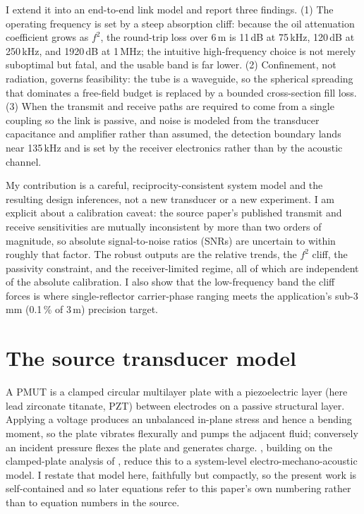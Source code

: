\documentclass{article}
\newcommand{\oilA}{11}      %
\newcommand{\oilB}{120}     %
\newcommand{\oilC}{1920}    %
\newcommand{\fbound}{135}   %
\begin{document}
I extend it into an end-to-end link model and report three findings. (1) The operating
frequency is set by a steep absorption cliff: because the oil attenuation coefficient grows
as $f^2$, the round-trip loss over 6\,m is \oilA\,dB at 75\,kHz, \oilB\,dB at 250\,kHz, and
\oilC\,dB at 1\,MHz; the intuitive high-frequency choice is not merely suboptimal but
fatal, and the usable band is far lower. (2) Confinement, not radiation, governs feasibility:
the tube is a waveguide, so the spherical spreading that dominates a free-field budget is
replaced by a bounded cross-section fill loss. (3) When the transmit and receive paths are
required to come from a single coupling so the link is passive, and noise is modeled from the
transducer capacitance and amplifier rather than assumed, the detection boundary lands near
\fbound\,kHz and is set by the receiver electronics rather than by the acoustic channel.

My contribution is a careful, reciprocity-consistent system model and the resulting design
inferences, not a new transducer or a new experiment. I am explicit about a calibration
caveat: the source paper's published transmit and receive sensitivities are mutually
inconsistent by more than two orders of magnitude, so absolute signal-to-noise ratios (SNRs)
are uncertain to within roughly that factor. The robust outputs are the relative trends,
the $f^2$ cliff, the passivity constraint, and the receiver-limited regime, all of which are
independent of the absolute calibration. I also show that the low-frequency band the cliff forces is where single-reflector carrier-phase ranging meets the application's sub-3\,mm (0.1\,\% of 3\,m) precision target.

\section{The source transducer model}\label{sec:source}
A PMUT is a clamped circular multilayer plate with a piezoelectric layer (here lead
zirconate titanate, PZT) between electrodes on a passive structural layer. Applying a voltage
produces an unbalanced in-plane stress and hence a bending moment, so the plate vibrates
flexurally and pumps the adjacent fluid; conversely an incident pressure flexes the plate and
generates charge. \citet{dangi2017}, building on the clamped-plate analysis of
\citet{sammaoura2012}, reduce this to a system-level electro-mechano-acoustic model. I restate
that model here, faithfully but compactly, so the present work is self-contained and so later
equations refer to this paper's own numbering rather than to equation numbers in the source.
\end{document}

